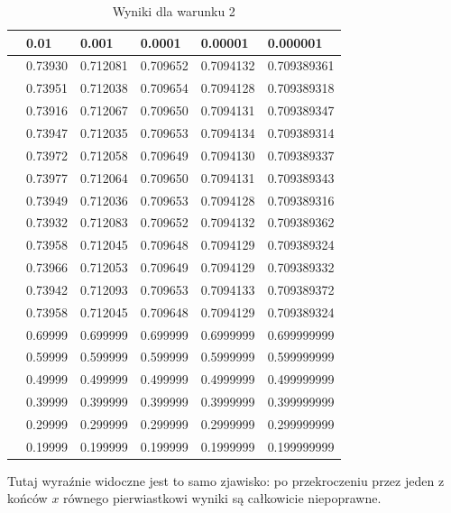\documentclass{article}
\begin{document}
\begin{table}[H]
\centering
\begin{tabular}{|l|l|l|l|l|l|}
\hline
& 0.01 & 0.001 & 0.0001 & 0.00001 & 0.000001 \\ \hline
[0.10, 1.90] & 0.73930 & 0.712081 & 0.709652 & 0.7094132 & 0.709389361 \\ \hline
[0.10, 1.80] & 0.73951 & 0.712038 & 0.709654 & 0.7094128 & 0.709389318 \\ \hline
[0.10, 1.70] & 0.73916 & 0.712067 & 0.709650 & 0.7094131 & 0.709389347 \\ \hline
[0.10, 1.60] & 0.73947 & 0.712035 & 0.709653 & 0.7094134 & 0.709389314 \\ \hline
[0.10, 1.50] & 0.73972 & 0.712058 & 0.709649 & 0.7094130 & 0.709389337 \\ \hline
[0.10, 1.40] & 0.73977 & 0.712064 & 0.709650 & 0.7094131 & 0.709389343 \\ \hline
[0.10, 1.30] & 0.73949 & 0.712036 & 0.709653 & 0.7094128 & 0.709389316 \\ \hline
[0.10, 1.20] & 0.73932 & 0.712083 & 0.709652 & 0.7094132 & 0.709389362 \\ \hline
[0.10, 1.10] & 0.73958 & 0.712045 & 0.709648 & 0.7094129 & 0.709389324 \\ \hline
[0.10, 1.00] & 0.73966 & 0.712053 & 0.709649 & 0.7094129 & 0.709389332 \\ \hline
[0.10, 0.90] & 0.73942 & 0.712093 & 0.709653 & 0.7094133 & 0.709389372 \\ \hline
[0.10, 0.80] & 0.73958 & 0.712045 & 0.709648 & 0.7094129 & 0.709389324 \\ \hline
[0.10, 0.70] & 0.69999 & 0.699999 & 0.699999 & 0.6999999 & 0.699999999 \\ \hline
[0.10, 0.60] & 0.59999 & 0.599999 & 0.599999 & 0.5999999 & 0.599999999 \\ \hline
[0.10, 0.50] & 0.49999 & 0.499999 & 0.499999 & 0.4999999 & 0.499999999 \\ \hline
[0.10, 0.40] & 0.39999 & 0.399999 & 0.399999 & 0.3999999 & 0.399999999 \\ \hline
[0.10, 0.30] & 0.29999 & 0.299999 & 0.299999 & 0.2999999 & 0.299999999 \\ \hline
[0.10, 0.20] & 0.19999 & 0.199999 & 0.199999 & 0.1999999 & 0.199999999 \\ \hline
\end{tabular}
\caption{Wyniki dla warunku 2}
\end{table}

Tutaj wyraźnie widoczne jest to samo zjawisko: po przekroczeniu przez jeden z końców $x$ równego pierwiastkowi
wyniki są całkowicie niepoprawne.
\end{document}
